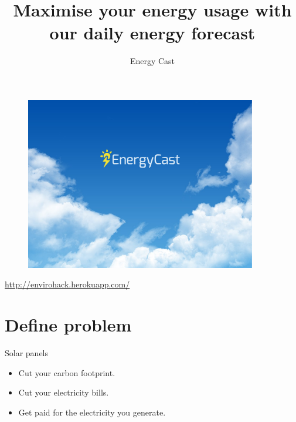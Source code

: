 \documentclass[15pt]{beamer}
\title[EnviroHack]{Maximise your energy usage with our daily energy forecast}
\author{Energy Cast}
\begin{document}
	



\begin{frame}[plain]{}
	\begin{figure}
		
		\includegraphics[width=0.9\textwidth]{pic/energycast-splash.pdf}
	\end{figure}	
\url{http://envirohack.herokuapp.com/}
\end{frame}


\section{Define problem}

\begin{frame}{Solar panels}
	\begin{itemize}
		
		\item Cut your carbon footprint.
		\item Cut your electricity bills.
		\item Get paid for the electricity you generate. 

	\end{itemize}
	

\end{frame}
\end{document}
